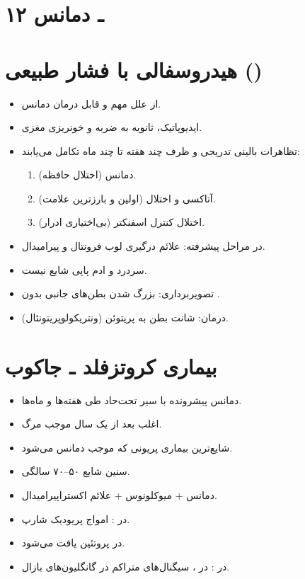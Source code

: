 \section*{۱۲ ـ دمانس}
\section{هیدروسفالی با فشار طبیعی ()}
\begin{itemize}
\item از علل مهم و قابل درمان دمانس.
\item ایدیوپاتیک، ثانویه به ضربه و خونریزی مغزی.
\item تظاهرات بالینی تدریجی و ظرف چند هفته تا چند ماه تکامل می‌یابند:
\begin{enumerate}[label=\en{\alph*.}]
\item دمانس (اختلال حافظه).
\item آتاکسی و اختلال  (اولین و بارزترین علامت).
\item اختلال کنترل اسفنکتر (بی‌اختیاری ادرار).
\end{enumerate}
\item در مراحل پیشرفته: علائم درگیری لوب فرونتال و پیرامیدال.
\item سردرد و ادم پاپی شایع نیست.
\item تصویربرداری: بزرگ شدن بطن‌های جانبی بدون .
\item درمان: شانت بطن به پریتوئن (ونتریکولوپریتونئال).
\end{itemize}
\section{بیماری کروتزفلد ـ جاکوب}
\begin{itemize}
\item دمانس پیشرونده با سیر تحت‌حاد طی هفته‌ها و ماه‌ها.
\item اغلب بعد از یک سال موجب مرگ.
\item شایع‌ترین بیماری پریونی که موجب دمانس می‌شود.
\item سنین شایع ۵۰–۷۰ سالگی.
\item دمانس + میوکلونوس + علائم اکستراپیرامیدال.
\item در : امواج پریودیک شارپ.
\item در  پروتئین  یافت می‌شود.
\item در : در ، سیگنال‌های متراکم در گانگلیون‌های بازال.
\end{itemize}

